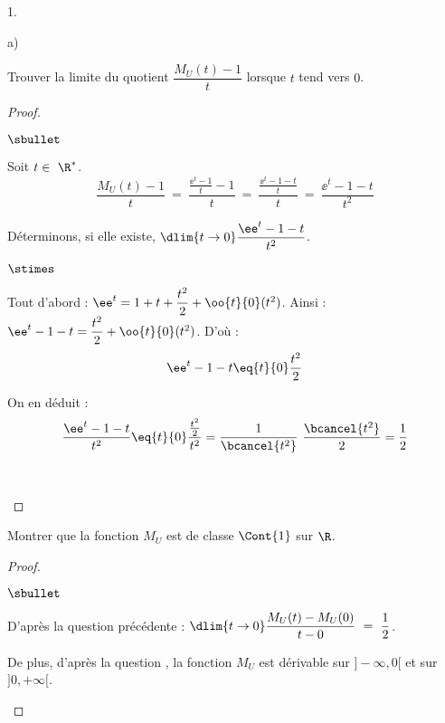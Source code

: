 \documentclass[11pt]{article}%
\begin{document}
\begin{noliste}{1.}
\begin{noliste}{a)}
  \item Trouver la limite du quotient $\dfrac{M_U(t) -1}{t}$ lorsque
    $t$ tend vers $0$.
    \begin{proof}~
      \begin{noliste}{$\sbullet$}
      \item Soit $t \in \ \R^*$.
        \[
          \dfrac{M_U(t) - 1}{t} \ = \ \dfrac{\frac{\ee^t -1}{t} -1}{t}
          \ = \ \dfrac{\frac{\ee^t - 1 -t}{t}}{t} \ = \ \dfrac{\ee^t
            -1 -t}{t^2}
        \]
        
      \item Déterminons, si elle existe, $\dlim{t\to 0} \dfrac{\ee^t
          -1-t}{t^2}$.
        \begin{noliste}{$\stimes$}
        \item Tout d'abord : $\ee^t = 1+t + \dfrac{t^2}{2} + \oo{t}{0}
            (t^2)$. Ainsi : $\ee^t - 1 -t = \dfrac{t^2}{2} +
          \oo{t}{0}(t^2)$. D'où :
          \[
            \ee^t - 1 - t \eq{t}{0} \dfrac{t^2}{2}
          \]
          
        \item On en déduit :
          \[
          \dfrac{\ee^t -1-t}{t^2} \eq{t}{0} \dfrac{\frac{t^2}{2}}{t^2}
          = \dfrac{1}{\bcancel{t^2}} \ \dfrac{\bcancel{t^2}}{2} =
          \dfrac{1}{2}
          \]
        \end{noliste}
        ~\\[-1.4cm]
      \end{noliste}
    \end{proof}
    
  \item Montrer que la fonction $M_U$ est de classe $\Cont{1}$ sur
    $\R$.
    \begin{proof}~
      \begin{noliste}{$\sbullet$}
      \item D'après la question précédente : $\dlim{t\to 0}
        \dfrac{M_U(t) - M_U(0)}{t-0} \ = \ \dfrac{1}{2}$.
        
      \item De plus, d'après la question , la fonction
        $M_U$ est dérivable sur $]-\infty,0[$ et sur $]0,+\infty[$.%



\end{noliste}
\end{proof}
\end{noliste}
\end{noliste}
\end{document}
